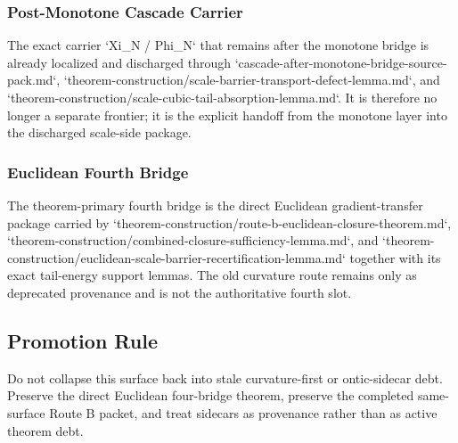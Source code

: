 \subsubsection{Post-Monotone Cascade Carrier}

The exact carrier `Xi\_N / Phi\_N` that remains after the monotone bridge is already localized and discharged through `cascade-after-monotone-bridge-source-pack.md`, `theorem-construction/scale-barrier-transport-defect-lemma.md`, and `theorem-construction/scale-cubic-tail-absorption-lemma.md`. It is therefore no longer a separate frontier; it is the explicit handoff from the monotone layer into the discharged scale-side package.

\subsubsection{Euclidean Fourth Bridge}

The theorem-primary fourth bridge is the direct Euclidean gradient-transfer
package carried by `theorem-construction/route-b-euclidean-closure-theorem.md`,
`theorem-construction/combined-closure-sufficiency-lemma.md`, and
`theorem-construction/euclidean-scale-barrier-recertification-lemma.md`
together with its exact tail-energy support lemmas. The old curvature route
remains only as deprecated provenance and is not the authoritative fourth slot.

\subsection{Promotion Rule}

Do not collapse this surface back into stale curvature-first or ontic-sidecar
debt. Preserve the direct Euclidean four-bridge theorem, preserve the completed
same-surface Route B packet, and treat sidecars as provenance rather than as
active theorem debt.
